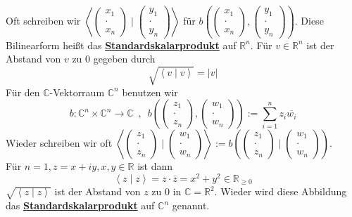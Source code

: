 Oft schreiben wir $\left\langle \left(\begin{smallmatrix}
	x_1 \\ \cdot \\ x_n
\end{smallmatrix} \right) \mid \left( \begin{smallmatrix}
	y_1 \\ \cdot \\ y_n
\end{smallmatrix} \right) \right\rangle$ für $b \left( \left( \begin{smallmatrix}
	x_1 \\ \cdot \\ x_n
\end{smallmatrix} \right), \left( \begin{smallmatrix}
	y_1 \\ \cdot \\ y_n
\end{smallmatrix} \right) \right)$. Diese Bilinearform heißt das \underline{\textbf{Standardskalarprodukt}} auf $\mathds{R}^n$. 
Für $v \in \mathds{R}^n$ ist der Abstand von $v$ zu 0 gegeben durch
\[
	\sqrt{\left\langle v \mid v \right\rangle } = |v| 
\]
Für den $\mathds{C}$-Vektorraum $\mathds{C}^n$ benutzen wir 
\[
	b : \mathds{C}^n \times \mathds{C}^n \to \mathds{C} \enspace , \enspace b \left( \left(\begin{smallmatrix}
	z_1 \\ \cdot \\ z_n
\end{smallmatrix}\right) ,  \left( \begin{smallmatrix}
	w_1 \\ \cdot \\ w_n
\end{smallmatrix} \right) \right) := \sum\limits_{i=1}^{n} z_i \overline{w_i}
\]
Wieder schreiben wir oft $\left\langle \left(\begin{smallmatrix}
	z_1 \\ \cdot \\ z_n
\end{smallmatrix} \right) \mid \left(\begin{smallmatrix}
	w_1 \\ \cdot \\ w_n
\end{smallmatrix} \right) \right\rangle := b \left( \left( \begin{smallmatrix}
	z_1 \\ \cdot \\ z_n
\end{smallmatrix} \right) \mid \left( \begin{smallmatrix}
	w_1 \\ \cdot \\ w_n
\end{smallmatrix} \right) \right)$. \\
Für $n=1, z= x + iy, x,y \in \mathds{R}$ ist dann
\[
	\left\langle z \mid z \right\rangle = z \cdot \overline{z} = x^2 + y^2 \in \mathds{R}_{\ge 0}  
\]
$\sqrt{\left\langle z \mid z \right\rangle} $ ist der Abstand von $z$ zu 0 in $\mathds{C} = \mathds{R}^2$. Wieder wird diese Abbildung das \underline{\textbf{Standardskalarprodukt}} auf $\mathds{C}^n$ genannt.

